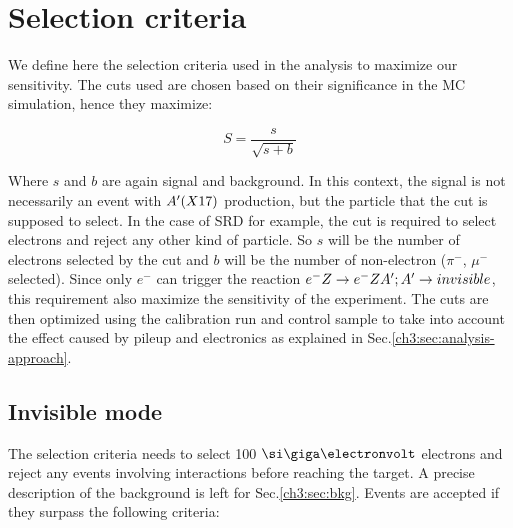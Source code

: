 \section{Selection criteria}
\label{ch3:sec:selection-criteria}

We define here the selection criteria used in the analysis to maximize our sensitivity. The cuts used are chosen based on their significance in the MC simulation, hence they maximize:

\begin{equation}
  \label{eq:significance}
  S = \frac{s}{\sqrt{s + b}}
\end{equation}

Where $s$ and $b$ are again signal and background. In this context, the signal is not necessarily an event with $A'(X17)$ production, but the particle that the cut is supposed to select. In the case of SRD for example, the cut is required to select electrons and reject any other kind of particle. So $s$ will be the number of electrons selected by the cut and $b$ will be the number of non-electron ($\pi^-$, $\mu^-$ selected). Since only $e^{-}$ can trigger the reaction $e^- Z \to e^- Z A'; A' \to invisible$, this requirement also maximize the sensitivity of the experiment. The cuts are then optimized using the calibration run and control sample to take into account the effect caused by pileup and electronics as explained in Sec.\ref{ch3:sec:analysis-approach}.

\subsection{Invisible mode}
\label{ch3:sec:selection-criteria-invis}

The selection criteria needs to select 100 $\gev$ electrons and reject any events involving interactions before reaching the target. A precise description of the background is left for Sec.\ref{ch3:sec:bkg}. Events are accepted if they surpass the following criteria:

